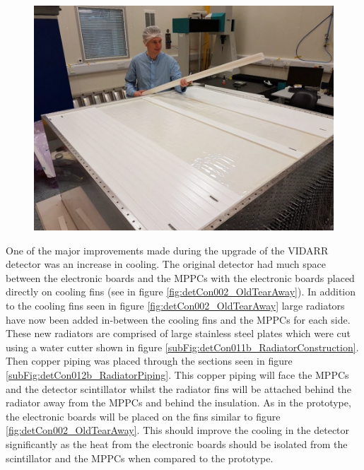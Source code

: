 \begin{figure}[!h]
\centering
\includegraphics[width=0.7\linewidth]{Chapter3/Figs/Raster/detCon006_RonInCleanRoom.png}
\label{fig:detCon006_RonInCleanRoom}
\end{figure}

One of the major improvements made during the upgrade of the VIDARR detector was an increase in cooling. The original detector had much space between the electronic boards and the MPPCs with the electronic boards placed directly on cooling fins (see in figure \ref{fig:detCon002_OldTearAway}). In addition to the cooling fins seen in figure \ref{fig:detCon002_OldTearAway} large radiators have now been added in-between the cooling fins and the MPPCs for each side. These new radiators are comprised of large stainless steel plates which were cut using a water cutter shown in figure \ref{subFig:detCon011b_RadiatorConstruction}. Then copper piping was placed through the sections seen in figure \ref{subFig:detCon012b_RadiatorPiping}. This copper piping will face the MPPCs and the detector scintillator whilst the radiator fins will be attached behind the radiator away from the MPPCs and behind the insulation. As in the prototype, the electronic boards will be placed on the fins similar to figure \ref{fig:detCon002_OldTearAway}. This should improve the cooling in the detector significantly as the heat from the electronic boards should be isolated from the scintillator and the MPPCs when compared to the prototype. 

